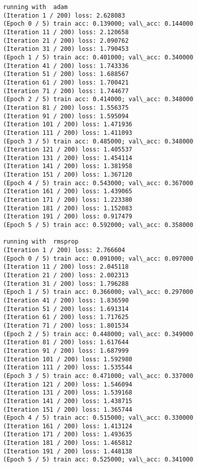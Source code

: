\documentclass[11pt]{article}
\begin{document}
    \begin{Verbatim}[commandchars=\\\{\}]
running with  adam
(Iteration 1 / 200) loss: 2.628083
(Epoch 0 / 5) train acc: 0.139000; val\_acc: 0.144000
(Iteration 11 / 200) loss: 2.120658
(Iteration 21 / 200) loss: 2.090762
(Iteration 31 / 200) loss: 1.790453
(Epoch 1 / 5) train acc: 0.401000; val\_acc: 0.340000
(Iteration 41 / 200) loss: 1.743336
(Iteration 51 / 200) loss: 1.688567
(Iteration 61 / 200) loss: 1.700421
(Iteration 71 / 200) loss: 1.744677
(Epoch 2 / 5) train acc: 0.414000; val\_acc: 0.348000
(Iteration 81 / 200) loss: 1.556375
(Iteration 91 / 200) loss: 1.595094
(Iteration 101 / 200) loss: 1.471936
(Iteration 111 / 200) loss: 1.411093
(Epoch 3 / 5) train acc: 0.485000; val\_acc: 0.348000
(Iteration 121 / 200) loss: 1.405537
(Iteration 131 / 200) loss: 1.454114
(Iteration 141 / 200) loss: 1.381958
(Iteration 151 / 200) loss: 1.367120
(Epoch 4 / 5) train acc: 0.543000; val\_acc: 0.367000
(Iteration 161 / 200) loss: 1.439065
(Iteration 171 / 200) loss: 1.223380
(Iteration 181 / 200) loss: 1.152083
(Iteration 191 / 200) loss: 0.917479
(Epoch 5 / 5) train acc: 0.592000; val\_acc: 0.358000

running with  rmsprop
(Iteration 1 / 200) loss: 2.766604
(Epoch 0 / 5) train acc: 0.091000; val\_acc: 0.097000
(Iteration 11 / 200) loss: 2.045118
(Iteration 21 / 200) loss: 2.002313
(Iteration 31 / 200) loss: 1.796288
(Epoch 1 / 5) train acc: 0.366000; val\_acc: 0.297000
(Iteration 41 / 200) loss: 1.836590
(Iteration 51 / 200) loss: 1.691314
(Iteration 61 / 200) loss: 1.717625
(Iteration 71 / 200) loss: 1.801534
(Epoch 2 / 5) train acc: 0.448000; val\_acc: 0.349000
(Iteration 81 / 200) loss: 1.617644
(Iteration 91 / 200) loss: 1.687999
(Iteration 101 / 200) loss: 1.592980
(Iteration 111 / 200) loss: 1.535544
(Epoch 3 / 5) train acc: 0.471000; val\_acc: 0.337000
(Iteration 121 / 200) loss: 1.546094
(Iteration 131 / 200) loss: 1.539168
(Iteration 141 / 200) loss: 1.438715
(Iteration 151 / 200) loss: 1.365744
(Epoch 4 / 5) train acc: 0.515000; val\_acc: 0.330000
(Iteration 161 / 200) loss: 1.413124
(Iteration 171 / 200) loss: 1.493635
(Iteration 181 / 200) loss: 1.465812
(Iteration 191 / 200) loss: 1.448138
(Epoch 5 / 5) train acc: 0.525000; val\_acc: 0.341000

    \end{Verbatim}

    \begin{center}
    \end{center}
    { \hspace*{\fill} \\}
    
\end{document}
